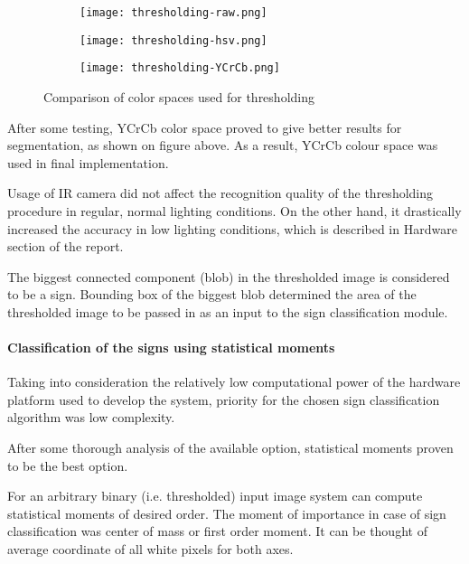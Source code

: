 \begin{figure}[th!]
	\centering
	\begin{subfigure}[b]{0.3\textwidth}
		\centering
	\texttt{[image: thresholding-raw.png]}
	\end{subfigure}
	\begin{subfigure}[b]{0.3\textwidth}
		\centering
		\texttt{[image: thresholding-hsv.png]}
	\end{subfigure}
	\begin{subfigure}[b]{0.3\textwidth}
		\centering
		\texttt{[image: thresholding-YCrCb.png]}
	\end{subfigure}
	\caption{Comparison of color spaces used for thresholding}
	\label{fig:color-spaces}
\end{figure}

After some testing, YCrCb color space proved to give better results for segmentation, as shown on figure above. As a result, YCrCb colour space was used in final implementation.

Usage of IR camera did not affect the recognition quality of the thresholding procedure in regular, normal lighting conditions. On the other hand, it drastically increased the accuracy in low lighting conditions, which is described in Hardware section of the report.

The biggest connected component (blob) in the thresholded image is considered to be a sign. Bounding box of the biggest blob determined the area of the thresholded image to be passed in as an input to the sign classification module. 

\paragraph{Classification of the signs using statistical moments}

Taking into consideration the relatively low computational power of the hardware platform used to develop the system, priority for the chosen sign classification algorithm was low complexity.

After some thorough analysis of the available option, statistical moments proven to be the best option.

For an arbitrary binary (i.e. thresholded) input image system can compute statistical moments of desired order. The moment of importance in case of sign classification was center of mass or first order moment. It can be thought of average coordinate of all white pixels for both axes.

